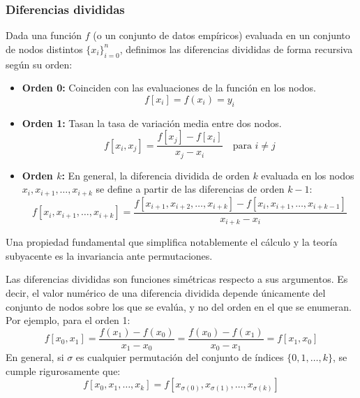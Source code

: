 \subsubsection{Diferencias divididas}

\begin{definición}
    Dada una función $f$ (o un conjunto de datos empíricos) evaluada en un conjunto de nodos distintos $\{ x_i \}_{i=0}^n$, definimos las diferencias divididas de forma recursiva según su orden:
    \begin{itemize}
        \item \textbf{Orden 0:} Coinciden con las evaluaciones de la función en los nodos.
        \[
            f[x_i] = f(x_i) = y_i
        \]
        \item \textbf{Orden 1:} Tasan la tasa de variación media entre dos nodos.
        \[
            f[x_i, x_j] = \frac{f[x_j] - f[x_i]}{x_j - x_i} \quad \text{para } i \neq j
        \]
        \item \textbf{Orden $k$:} En general, la diferencia dividida de orden $k$ evaluada en los nodos $x_i, x_{i+1}, \ldots, x_{i+k}$ se define a partir de las diferencias de orden $k-1$:
        \[
            f[x_i, x_{i+1}, \ldots, x_{i+k}] = 
            \frac{f[x_{i+1}, x_{i+2}, \ldots, x_{i+k}] - f[x_i, x_{i+1}, \ldots, x_{i+k-1}]}{x_{i+k} - x_i}
        \]
    \end{itemize}
\end{definición}


Una propiedad fundamental que simplifica notablemente el cálculo y la teoría subyacente es la invariancia ante permutaciones.

\begin{proposición}
    Las diferencias divididas son funciones simétricas respecto a sus argumentos. Es decir, el valor numérico de una diferencia dividida depende únicamente del conjunto de nodos sobre los que se evalúa, y no del orden en el que se enumeran. Por ejemplo, para el orden 1:
    \[
        f[x_0, x_1] = \frac{f(x_1) - f(x_0)}{x_1 - x_0} = \frac{f(x_0) - f(x_1)}{x_0 - x_1} = f[x_1, x_0]
    \]
    En general, si $\sigma$ es cualquier permutación del conjunto de índices $\{ 0, 1, \ldots, k \}$, se cumple rigurosamente que:
    \[
        f[x_0, x_1, \ldots, x_k] = f[x_{\sigma(0)}, x_{\sigma(1)}, \ldots, x_{\sigma(k)}]
    \]
\end{proposición}

